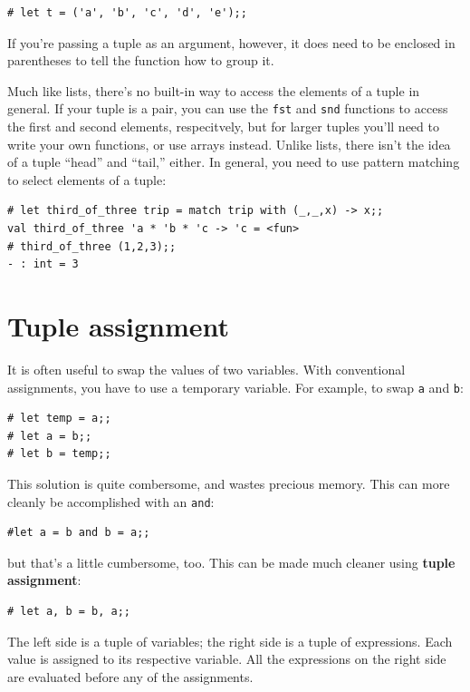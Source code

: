 \documentclass[10pt]{book}
\begin{document}
{

\beforeverb
\begin{verbatim}
# let t = ('a', 'b', 'c', 'd', 'e');;
\end{verbatim}
\afterverb
%
If you're passing a tuple as an argument, however, it does need to be enclosed in parentheses to tell the function how to group it.

Much like lists, there's no built-in way to access the elements of a tuple in general. If your tuple is a pair, you can use the {\tt fst} and {\tt snd} functions to access the first and second elements, respecitvely, but for larger tuples you'll need to write your own functions, or use arrays instead. Unlike lists, there isn't the idea of a tuple ``head'' and ``tail,'' either. In general, you need to use pattern matching to select elements of a tuple:

\beforeverb
\begin{verbatim}
# let third_of_three trip = match trip with (_,_,x) -> x;;
val third_of_three 'a * 'b * 'c -> 'c = <fun>
# third_of_three (1,2,3);;
- : int = 3
\end{verbatim}
\afterverb

\section{Tuple assignment}
\label{tuple assignment}


It is often useful to swap the values of two variables.
With conventional assignments, you have to use a temporary
variable.  For example, to swap {\tt a} and {\tt b}:

\beforeverb
\begin{verbatim}
# let temp = a;;
# let a = b;;
# let b = temp;;
\end{verbatim}
\afterverb
%
This solution is quite combersome, and wastes precious memory. This can more cleanly be accomplished with an {\tt and}:

\beforeverb
\begin{verbatim}
#let a = b and b = a;;
\end{verbatim}
\afterverb

but that's a little cumbersome, too. This can be made much cleaner using {\bf tuple assignment}:

\beforeverb
\begin{verbatim}
# let a, b = b, a;;
\end{verbatim}
\afterverb
%
The left side is a tuple of variables; the right side is a tuple of
expressions.  Each value is assigned to its respective variable.  
All the expressions on the right side are evaluated before any
of the assignments.

}
\end{document}
